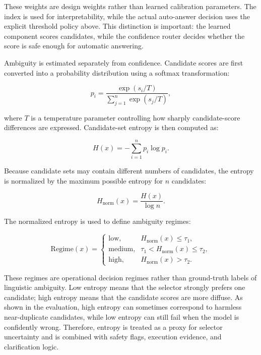 These weights are design weights rather than learned calibration parameters.
The index is used for interpretability, while the actual auto-answer decision
uses the explicit threshold policy above. This distinction is important: the
learned component scores candidates, while the confidence router decides
whether the score is safe enough for automatic answering.

Ambiguity is estimated separately from confidence. Candidate scores are first
converted into a probability distribution using a softmax transformation:

\begin{equation}
p_i = \frac{\exp(s_i/T)}{\sum_{j=1}^{n}\exp(s_j/T)},
\end{equation}

where $T$ is a temperature parameter controlling how sharply candidate-score
differences are expressed. Candidate-set entropy is then computed as:

\begin{equation}
H(x) = -\sum_{i=1}^{n} p_i \log p_i.
\end{equation}

Because candidate sets may contain different numbers of candidates, the entropy
is normalized by the maximum possible entropy for $n$ candidates:

\begin{equation}
H_{\text{norm}}(x) = \frac{H(x)}{\log n}.
\end{equation}

The normalized entropy is used to define ambiguity regimes:

\begin{equation}
\text{Regime}(x) =
\begin{cases}
\text{low}, & H_{\text{norm}}(x) \leq \tau_1, \\
\text{medium}, & \tau_1 < H_{\text{norm}}(x) \leq \tau_2, \\
\text{high}, & H_{\text{norm}}(x) > \tau_2.
\end{cases}
\end{equation}

These regimes are operational decision regimes rather than ground-truth labels
of linguistic ambiguity. Low entropy means that the selector strongly prefers
one candidate; high entropy means that the candidate scores are more diffuse.
As shown in the evaluation, high entropy can sometimes correspond to harmless
near-duplicate candidates, while low entropy can still fail when the model is
confidently wrong. Therefore, entropy is treated as a proxy for selector
uncertainty and is combined with safety flags, execution evidence, and
clarification logic.

